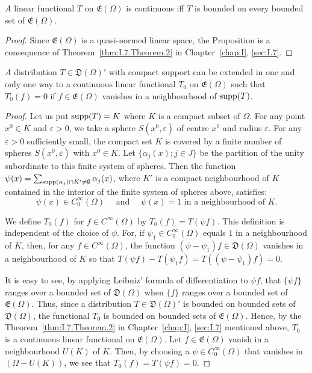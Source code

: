 \begin{proposition}\label{prop:I.13.Proposition.2} $A$ linear functional $T$ on $\mathfrak{E}(\Omega)$ is continuous iff $T$ is bounded on every bounded set of $\mathfrak{E}(\Omega)$. 
\end{proposition}

\begin{proof}
 Since $\mathfrak{E}(\Omega)$ is a quasi-normed linear space, the Proposition is a consequence of Theorem~\ref{thm:I.7.Theorem.2} in Chapter~\ref{chap:I}, \ref{sec:I.7}. 
\end{proof}

\begin{proposition}\label{prop:I.13.Proposition.3} $A$ distribution $T \in \mathfrak{D}(\Omega)'$ with compact support can be extended in one and only one way to a continuous linear functional $T_0$ on $\mathfrak{E}(\Omega)$ such that $T_0(f) = 0$ if $f \in \mathfrak{E}(\Omega)$ vanishes in a neighbourhood of $\operatorname{supp}(T)$. 
\end{proposition}

\begin{proof}
 Let us put $\operatorname{supp}(T) = K$ where $K$ is a compact subset of $\Omega$. For any point $x^0 \in K$ and $\varepsilon > 0$, we take a sphere $S(x^0, \varepsilon)$ of centre $x^0$ and radius $\varepsilon$. For any $\varepsilon > 0$ sufficiently small, the compact set $K$ is covered by a finite number of spheres $S(x^0, \varepsilon)$ with $x^0 \in K$. Let $\{\alpha_j(x); j \in J\}$ be the partition of the unity subordinate to this finite system of spheres. Then the function $\psi(x) = \sum\nolimits_{\operatorname{supp}(\alpha_j) \cap K' \neq \emptyset} \alpha_j(x)$, where $K'$ is a compact neighbourhood of $K$ contained in the interior of the finite system of spheres above, satisfies: 
\[
\psi (x) \in C_{0} ^{\infty} (\Omega) \quad \text{ and } \quad \psi (x) = 1 \text{ in a neighbourhood of } K. \]

We define $T_0(f)$ for $f \in C^\infty(\Omega)$ by $T_0(f) = T(\psi f)$. This definition is independent of the choice of $\psi$. For, if $\psi_1 \in C_0^\infty(\Omega)$ equals $1$ in a neighbourhood of $K$, then, for any $f \in C^\infty(\Omega)$, the function $(\psi- \psi_1)f \in \mathfrak{D}(\Omega)$ vanishes in a neighbourhood of $K$ so that $T(\psi f)- T(\psi_1f) = T((\psi- \psi_1)f) = 0$. 


It is easy to see, by applying Leibniz' formula of differentiation to $\psi f$, that $\{\psi f\}$ ranges over a bounded set of $\mathfrak{D}(\Omega)$ when $\{f\}$ ranges over a bounded set of $\mathfrak{E}(\Omega)$. Thus, since a distribution $T \in \mathfrak{D}(\Omega)'$ is bounded on bounded sets of $\mathfrak{D}(\Omega)$, the functional $T_0$ is bounded on bounded sets of $\mathfrak{E}(\Omega)$. Hence, by the Theorem~\ref{thm:I.7.Theorem.2} in Chapter~\ref{chap:I}, \ref{sec:I.7} mentioned above, $T_0$ is a continuous linear functional on $\mathfrak{E}(\Omega)$. Let $f \in \mathfrak{E}(\Omega)$ vanish in a neighbourhood $U(K)$ of $K$. Then, by choosing a $\psi \in C_0^\infty(\Omega)$ that vanishes in $(\Omega- U(K))$, we see that $T_0(f) = T(\psi f) = 0$.
\end{proof}

